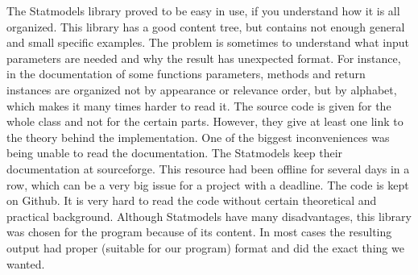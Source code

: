\documentclass{article}
\begin{document}
The Statmodels library proved to be easy in use, if you understand how it is all organized. This library has a good content tree, but contains not enough general and small specific examples. The problem is sometimes to understand what input parameters are needed and why the result has unexpected format. For instance, in the documentation of some functions parameters, methods and return instances are organized not by appearance or relevance order, but by alphabet, which makes it many times harder to read it. The source code is given for the whole class and not for the certain parts. However, they give at least one link to the theory behind the implementation. One of the biggest inconveniences was being unable to read the documentation. The Statmodels keep their documentation at sourceforge. This resource had been offline for several days in a row, which can be a very big issue for a project with a deadline. The code is kept on Github. It is very hard to read the code without certain theoretical and practical background. Although Statmodels have many disadvantages, this library was chosen for the program because of its content. In most cases the resulting output had proper (suitable for our program) format and did the exact thing we wanted.\\
\end{document}
